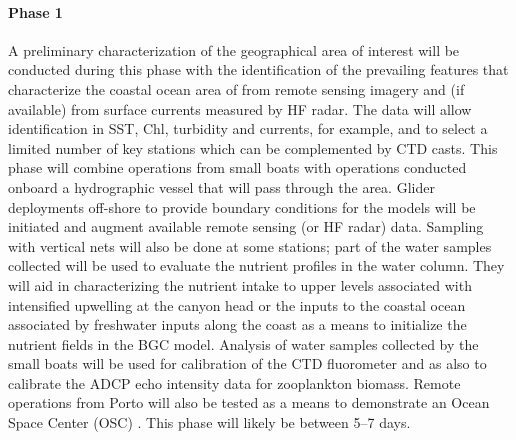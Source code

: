 \paragraph{Phase 1} A preliminary characterization of the geographical
area of interest will be conducted during this phase with the
identification of the prevailing features that characterize the coastal
ocean area of \naz from remote sensing imagery and (if available) from
surface currents measured by HF radar. The data will allow
identification in SST, Chl, turbidity and currents, for example, and to
select a limited number of key stations which can be complemented by CTD
casts. %
This phase will combine operations from small boats with operations
conducted onboard a \inst hydrographic vessel that will pass through the
area. Glider deployments off-shore to provide boundary conditions for
the models will be initiated and augment available remote sensing (or HF
radar) data. Sampling with vertical nets will also be done at some
stations; part of the water samples collected will be used to evaluate
the nutrient profiles in the water column. %
They will aid in characterizing the nutrient intake to upper levels
associated with intensified upwelling at the canyon head or the inputs
to the coastal ocean associated by freshwater inputs along the coast as
a means to initialize the nutrient fields in the BGC model. Analysis of
water samples collected by the small boats will be used for calibration
of the CTD fluorometer and as also to calibrate the ADCP echo intensity
data for zooplankton biomass. Remote operations from Porto will also be
tested as a means to demonstrate an Ocean Space Center (OSC)
\cite{lima21}. This phase will likely be between 5--7 days.

 
